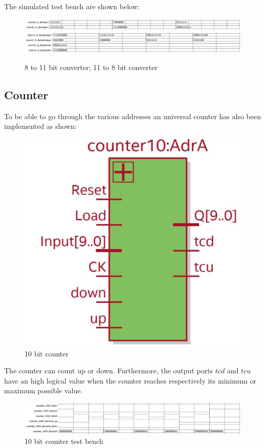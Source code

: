 \documentclass[12pt]{article}
\begin{document}
The simulated test bench are shown below: 

\begin{figure}[h!]
	\centering
	\includegraphics[scale = 0.47]{immagini/8_11_tb.png}
	\vspace{1mm}	
	\centering
	\includegraphics[scale = 0.47]{immagini/11_8_tb.png}
	\caption{8 to 11 bit converter; 11 to 8 bit converter}
\end{figure}
\newpage
\subsection*{Counter}
To be able to go through the various addresses an universal counter has also been implemented as shown: 
\begin{figure}[h!]
	\centering
	\includegraphics[scale = 0.47]{immagini/counter10.jpg}
	\caption{10 bit counter}
\end{figure}
The counter can count up or down. 
Furthermore, the output ports $tcd$ and $tcu$ have an high logical value when the counter reaches respectively its minimum or maximum possible value.

\begin{figure}[h]
	\centering
	\includegraphics[scale = 0.47]{immagini/counter_tb.png}
	\caption{10 bit counter test bench}
\end{figure}
\end{document}
